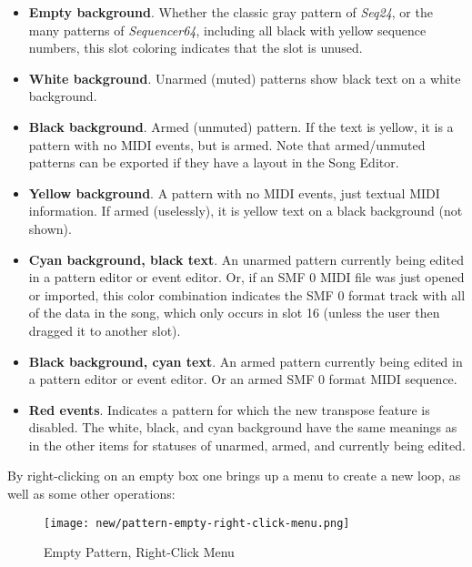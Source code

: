    \begin{itemize}
      \item \textbf{Empty background}.  Whether the classic gray pattern
         of \textsl{Seq24}, or the many patterns of \textsl{Sequencer64},
         including all black with yellow sequence numbers, this
         slot coloring indicates that the slot is unused.
      \item \textbf{White background}.  Unarmed (muted) patterns show black
         text on a white background.
      \item \textbf{Black background}.  Armed (unmuted) pattern.  If the text
         is yellow, it is a pattern with no MIDI events, but is armed.  Note
         that armed/unmuted patterns can be exported if they have a layout in
         the Song Editor.
      \item \textbf{Yellow background}.  A pattern with no MIDI events, just
         textual MIDI information.  If armed (uselessly), it is yellow text on
         a black background (not shown).
      \item \textbf{Cyan background, black text}.
         An unarmed pattern currently being edited in a pattern editor or event
         editor. Or, if an SMF 0 MIDI file was just opened or imported, this
         color combination indicates the SMF 0 format track with all of the
         data in the song, which only occurs in slot 16 (unless the user then
         dragged it to another slot).
      \item \textbf{Black background, cyan text}.
         An armed pattern currently being edited in a pattern editor or event
         editor.  Or an armed SMF 0 format MIDI sequence.
      \item \textbf{Red events}.
         Indicates a pattern for which the new transpose feature is
         disabled.  The white, black, and cyan background have the same
         meanings as in the other items for statuses of unarmed, armed, and
         currently being edited.
   \end{itemize}

   By right-clicking on an empty box one brings up a menu to create
   a new loop, as well as some other operations:

\begin{figure}[H]
   \centering 
   \texttt{[image: new/pattern-empty-right-click-menu.png]}
   \caption{Empty Pattern, Right-Click Menu}
   \label{fig:pattern_window_empty_right_click}
\end{figure}

